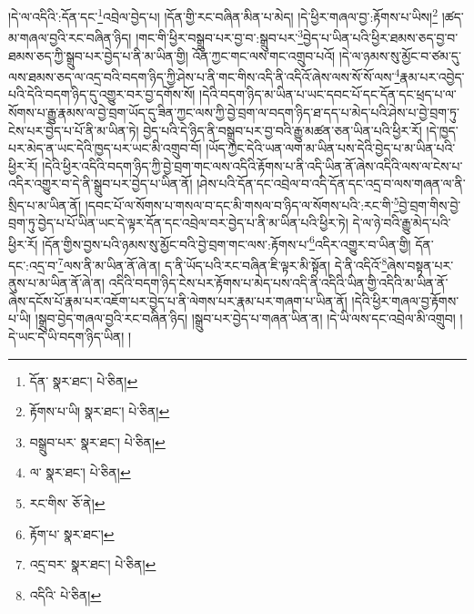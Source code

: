 །དེ་ལ་འདིའི་:དོན་དང་\footnote{དོན་  སྣར་ཐང་།  པེ་ཅིན། }འབྲེལ་བྱེད་པ། །དོན་གྱི་རང་བཞིན་མིན་པ་མེད། །དེ་ཕྱིར་གཞལ་བྱ་:རྟོགས་པ་ཡིས།\footnote{རྟོགས་པ་ཡི།  སྣར་ཐང་།  པེ་ཅིན། } །ཚད་མ་གཞལ་བྱའི་རང་བཞིན་ཉིད། །གང་གི་ཕྱིར་བསྒྲུབ་པར་བྱ་བ་:སྒྲུབ་པར་\footnote{བསྒྲུབ་པར་  སྣར་ཐང་།  པེ་ཅིན། }བྱེད་པ་ཡིན་པའི་ཕྱིར་ཐམས་ཅད་བྱ་བ་ཐམས་ཅད་ཀྱི་སྒྲུབ་པར་བྱེད་པ་ནི་མ་ཡིན་གྱི། འོན་ཀྱང་གང་ལས་གང་འགྲུབ་པའོ། །དེ་ལ་ཉམས་སུ་མྱོང་བ་ཙམ་དུ་ལས་ཐམས་ཅད་ལ་འདྲ་བའི་བདག་ཉིད་ཀྱི་ཤེས་པ་ནི་གང་གིས་འདི་ནི་འདིའོ་ཞེས་ལས་སོ་སོ་ལས་\footnote{ལ་  སྣར་ཐང་།  པེ་ཅིན། }རྣམ་པར་འབྱེད་པའི་དེའི་བདག་ཉིད་དུ་འགྱུར་བར་བྱ་དགོས་སོ། །དེའི་བདག་ཉིད་མ་ཡིན་པ་ཡང་དབང་པོ་དང་དོན་དང་ཕྲད་པ་ལ་སོགས་པ་རྒྱུ་རྣམས་ལ་བྱེ་བྲག་ཡོད་དུ་ཟིན་ཀྱང་ལས་ཀྱི་བྱེ་བྲག་ལ་བདག་ཉིད་ཐ་དད་པ་མེད་པའི་ཤེས་པ་བྱེ་བྲག་ཏུ་ངེས་པར་བྱེད་པ་པོ་ནི་མ་ཡིན་ཏེ། བྱེད་པའི་དེ་ཉིད་ནི་བསྒྲུབ་པར་བྱ་བའི་རྒྱུ་མཚན་ཅན་ཡིན་པའི་ཕྱིར་རོ། །དེ་ཁྱད་པར་མེད་ན་ཡང་དེའི་ཁྱད་པར་ཡང་མི་འགྲུབ་བོ། །ཡོད་ཀྱང་དེའི་ཡན་ལག་མ་ཡིན་པས་དེའི་བྱེད་པ་མ་ཡིན་པའི་ཕྱིར་རོ། །དེའི་ཕྱིར་འདིའི་བདག་ཉིད་ཀྱི་བྱེ་བྲག་གང་ལས་འདིའི་རྟོགས་པ་ནི་འདི་ཡིན་ནོ་ཞེས་འདིའི་ལས་ལ་ངེས་པ་འདིར་འགྱུར་བ་དེ་ནི་སྒྲུབ་པར་བྱེད་པ་ཡིན་ནོ། །ཤེས་པའི་དོན་དང་འབྲེལ་བ་འདི་དོན་དང་འདྲ་བ་ལས་གཞན་ལ་ནི་སྲིད་པ་མ་ཡིན་ནོ། །དབང་པོ་ལ་སོགས་པ་གསལ་བ་དང་མི་གསལ་བ་ཉིད་ལ་སོགས་པའི་:རང་གི་\footnote{རང་གིས་  ཅོ་ནེ། }བྱེ་བྲག་གིས་བྱེ་བྲག་ཏུ་བྱེད་པ་པོ་ཡིན་ཡང་དེ་ལྟར་དོན་དང་འབྲེལ་བར་བྱེད་པ་ནི་མ་ཡིན་པའི་ཕྱིར་ཏེ། དེ་ལ་ཉེ་བའི་རྒྱུ་མེད་པའི་ཕྱིར་རོ། །དོན་གྱིས་བྱས་པའི་ཉམས་སུ་མྱོང་བའི་བྱེ་བྲག་གང་ལས་:རྟོགས་པ་\footnote{རྟོག་པ་  སྣར་ཐང་། }འདིར་འགྱུར་བ་ཡིན་གྱི། དོན་དང་:འདྲ་བ་\footnote{འདྲ་བར་  སྣར་ཐང་།  པེ་ཅིན། }ལས་ནི་མ་ཡིན་ནོ་ཞེ་ན། ད་ནི་ཡོད་པའི་རང་བཞིན་ཇི་ལྟར་མི་སྟོན། དེ་ནི་འདིའོ་\footnote{འདིའི་  པེ་ཅིན། }ཞེས་བསྟན་པར་ནུས་པ་མ་ཡིན་ནོ་ཞེ་ན། འདིའི་བདག་ཉིད་ངེས་པར་རྟོགས་པ་མེད་པས་འདི་ནི་འདིའི་ཡིན་གྱི་འདིའི་མ་ཡིན་ནོ་ཞེས་དངོས་པོ་རྣམ་པར་འཇོག་པར་བྱེད་པ་ནི་ལེགས་པར་རྣམ་པར་གཞག་པ་ཡིན་ནོ། །དེའི་ཕྱིར་གཞལ་བྱ་རྟོགས་པ་ཡི། །སྒྲུབ་བྱེད་གཞལ་བྱའི་རང་བཞིན་ཉིད། །སྒྲུབ་པར་བྱེད་པ་གཞན་ཡིན་ན། །དེ་ཡི་ལས་དང་འབྲེལ་མི་འགྲུབ། །དེ་ཡང་དེ་ཡི་བདག་ཉིད་ཡིན། །
